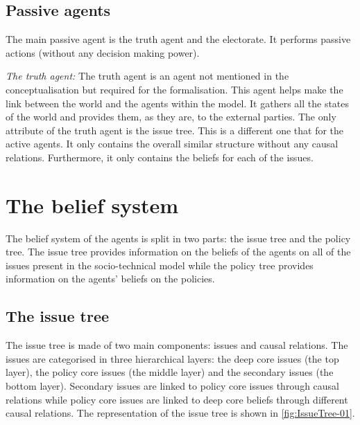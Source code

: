 \documentclass[11pt]{article}
\begin{document}
\subsection{Passive agents}
\label{ssec:passiveAgents}

The main passive agent is the truth agent and the electorate. It performs passive actions (without any decision making power).

\emph{The truth agent: } The truth agent is an agent not mentioned in the conceptualisation but required for the formalisation. This agent helps make the link between the world and the agents within the model. It gathers all the states of the world and provides them, as they are, to the external parties. The only attribute of the truth agent is the issue tree. This is a different one that for the active agents. It only contains the overall similar structure without any causal relations. Furthermore, it only contains the beliefs for each of the issues.


\section{The belief system}
\label{sec:beliefSystem}

The belief system of the agents is split in two parts: the issue tree and the policy tree. The issue tree provides information on the beliefs of the agents on all of the issues present in the socio-technical model while the policy tree provides information on the agents' beliefs on the policies.

\subsection{The issue tree}
\label{ssec:issueTree}

The issue tree is made of two main components: issues and causal relations. The issues are categorised in three hierarchical layers: the deep core issues (the top layer), the policy core issues (the middle layer) and the secondary issues (the bottom layer)\citep{sabatier1998advocacy}. Secondary issues are linked to policy core issues through causal relations while policy core issues are linked to deep core beliefs through different causal relations. The representation of the issue tree is shown in \autoref{fig:IssueTree-01}.
\end{document}
